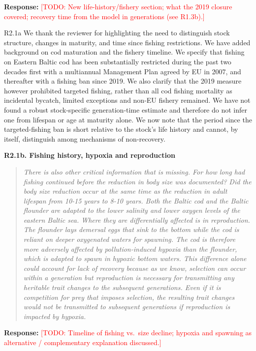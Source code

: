 \documentclass[11pt]{article}
\newenvironment{revcomment}[1]
  {\par\medskip\noindent\textbf{#1}\par\begin{quote}\itshape\color{commentgrey}}
  {\end{quote}}
\newcommand{\response}{\par\noindent\textbf{Response:} }
\newcommand{\todo}[1]{\textcolor{red}{[TODO: #1]}}
\begin{document}
\response \todo{New life-history/fishery section; what the 2019 closure covered; recovery time from the model in generations (see R1.3b).}

R2.1a
We thank the reviewer for highlighting the need to distinguish stock structure, changes in maturity, and time since fishing restrictions. We have added background on cod maturation and the fishery timeline. We specify that fishing on Eastern Baltic cod has been substantially restricted during the past two decades first with a multiannual Management Plan agreed by EU in 2007, and thereafter with a fishing ban since 2019. We also clarify that the 2019 measure however prohibited targeted fishing, rather than all cod fishing mortality as incidental bycatch, limited exceptions and non-EU fishery remained. We have not found a robust stock-specific generation-time estimate and therefore do not infer one from lifespan or age at maturity alone. We now note that the period since the targeted-fishing ban is short relative to the stock’s life history and cannot, by itself, distinguish among mechanisms of non-recovery.


\begin{revcomment}{R2.1b. Fishing history, hypoxia and reproduction}
There is also other critical information that is missing. For how long had fishing continued before the reduction in body size was documented? Did the body size reduction occur at the same time as the reduction in adult lifespan from 10-15 years to 8-10 years. Both the Baltic cod and the Baltic flounder are adapted to the lower salinity and lower oxygen levels of the eastern Baltic sea. Where they are differentially affected is in reproduction. The flounder lays demersal eggs that sink to the bottom while the cod is reliant on deeper oxygenated waters for spawning. The cod is therefore more adversely affected by pollution-induced hypoxia than the flounder, which is adapted to spawn in hypoxic bottom waters. This difference alone could account for lack of recovery because as we know, selection can occur within a generation but reproduction is necessary for transmitting any heritable trait changes to the subsequent generations. Even if it is competition for prey that imposes selection, the resulting trait changes would not be transmitted to subsequent generations if reproduction is impacted by hypoxia.
\end{revcomment}

\response \todo{Timeline of fishing vs.\ size decline; hypoxia and spawning as alternative / complementary explanation discussed.}
\end{document}
